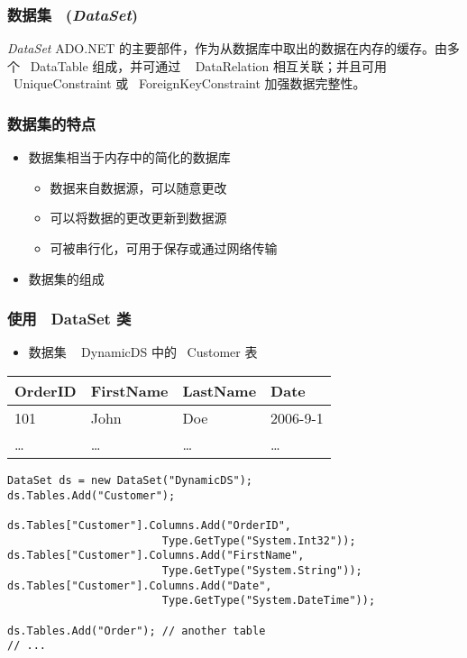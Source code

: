 \begin{frame}
\frametitle{数据集 ~(\textit{DataSet})}
\begin{block}{\textit{DataSet}}
\CJKindent ADO.NET 的主要部件，作为从数据库中取出的数据在内存的缓存。由多个
 ~DataTable 组成，并可通过 ~ DataRelation 相互关联；并且可用 ~UniqueConstraint
或 ~ForeignKeyConstraint 加强数据完整性。
\end{block}
\begin{center}
  
\end{center}
\end{frame}

\begin{frame}
\frametitle{数据集的特点}
\begin{itemize}
\setlength{\itemsep}{6pt plus 1pt}
\item 数据集相当于内存中的简化的数据库
\begin{itemize}
\item 数据来自数据源，可以随意更改
\item 可以将数据的更改更新到数据源
\item 可被串行化，可用于保存或通过网络传输
\end{itemize}
\item 数据集的组成
\end{itemize}
\begin{center}
  
\end{center}
\end{frame}

\begin{frame}[fragile]
\frametitle{使用 ~DataSet 类}
\begin{center}
  
\begin{itemize}
\item 数据集 ~ DynamicDS 中的 ~Customer 表
\end{itemize}
  \begin{tabular}{|l|l|l|l|}
    \hline
    \footnotesize \textbf{OrderID} & \footnotesize \textbf{FirstName} & \footnotesize \textbf{LastName} & \footnotesize \textbf{Date} \\
    \hline
    101              & John               & Doe               & 2006-9-1      \\
    \hline
    \dots            & \dots              & \dots             & \dots         \\
    \hline
  \end{tabular}
\end{center}
\begin{lstlisting}
DataSet ds = new DataSet("DynamicDS");
ds.Tables.Add("Customer");

ds.Tables["Customer"].Columns.Add("OrderID", 
                        Type.GetType("System.Int32"));
ds.Tables["Customer"].Columns.Add("FirstName", 
                        Type.GetType("System.String"));
ds.Tables["Customer"].Columns.Add("Date",
                        Type.GetType("System.DateTime"));

ds.Tables.Add("Order"); // another table
// ...
\end{lstlisting}
\end{frame}

